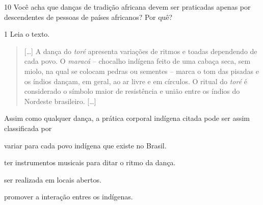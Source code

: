 \num{10} Você acha que danças de tradição africana devem ser praticadas apenas por descendentes de pessoas de países africanos? Por quê?



\num{1} Leia o texto.
\begin{quote}
  {[}\ldots{}{]} A dança do \emph{toré} apresenta variações de ritmos e toadas
  dependendo de cada povo. O \emph{maracá} -- chocalho indígena feito de
  uma cabaça seca, sem miolo, na qual se colocam pedras ou sementes --
  marca o tom das pisadas e os índios dançam, em geral, ao ar livre e em
  círculos. O ritual do \emph{toré} é considerado o símbolo maior de
  resistência e união entre os índios
  do Nordeste brasileiro. {[}\ldots{}{]}

\end{quote}

\noindent{}Assim como qualquer dança, a prática corporal indígena citada pode ser assim classificada por

\begin{escolha}
\item variar para cada povo indígena que existe no Brasil.

\item ter instrumentos musicais para ditar o ritmo da dança.

\item ser realizada em locais abertos.

\item promover a interação entres os indígenas.
\end{escolha}


